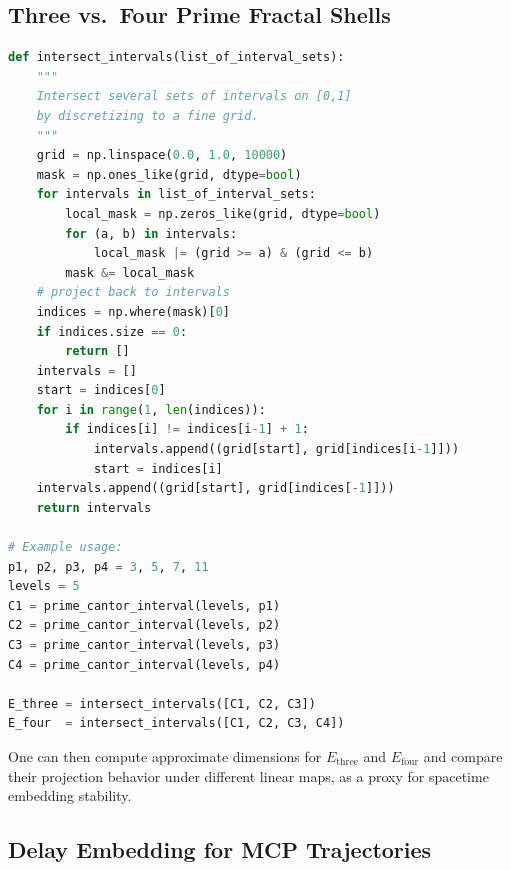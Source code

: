 \documentclass[11pt]{article}
\begin{document}
\subsection{Three vs.\ Four Prime Fractal Shells}

\begin{lstlisting}[language=Python,caption={Intersecting three vs.\ four prime Cantor sets}]
def intersect_intervals(list_of_interval_sets):
    """
    Intersect several sets of intervals on [0,1]
    by discretizing to a fine grid.
    """
    grid = np.linspace(0.0, 1.0, 10000)
    mask = np.ones_like(grid, dtype=bool)
    for intervals in list_of_interval_sets:
        local_mask = np.zeros_like(grid, dtype=bool)
        for (a, b) in intervals:
            local_mask |= (grid >= a) & (grid <= b)
        mask &= local_mask
    # project back to intervals
    indices = np.where(mask)[0]
    if indices.size == 0:
        return []
    intervals = []
    start = indices[0]
    for i in range(1, len(indices)):
        if indices[i] != indices[i-1] + 1:
            intervals.append((grid[start], grid[indices[i-1]]))
            start = indices[i]
    intervals.append((grid[start], grid[indices[-1]]))
    return intervals

# Example usage:
p1, p2, p3, p4 = 3, 5, 7, 11
levels = 5
C1 = prime_cantor_interval(levels, p1)
C2 = prime_cantor_interval(levels, p2)
C3 = prime_cantor_interval(levels, p3)
C4 = prime_cantor_interval(levels, p4)

E_three = intersect_intervals([C1, C2, C3])
E_four  = intersect_intervals([C1, C2, C3, C4])
\end{lstlisting}

One can then compute approximate dimensions for $E_{\text{three}}$ and
$E_{\text{four}}$ and compare their projection behavior under different
linear maps, as a proxy for spacetime embedding stability.

\subsection{Delay Embedding for MCP Trajectories}
\end{document}
